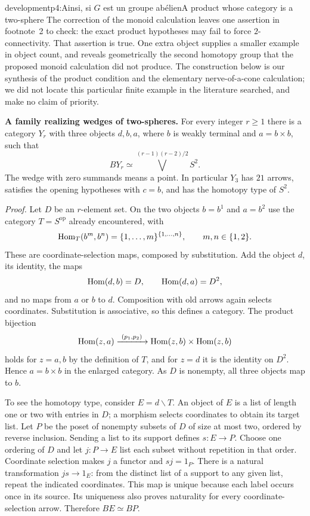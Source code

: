\begin{dcomment}{development}{p4:Ainsi, si $G$ est un groupe abélien}{A product whose category is a two-sphere}
The correction of the monoid calculation leaves one assertion in footnote~2 to check: the exact product hypotheses may fail to force $2$-connectivity. That assertion is true. One extra object supplies a smaller example in object count, and reveals geometrically the second homotopy group that the proposed monoid calculation did not produce. The construction below is our synthesis of the product condition and the elementary nerve-of-a-cone calculation; we did not locate this particular finite example in the literature searched, and make no claim of priority.

\textbf{A family realizing wedges of two-spheres.}\ours
For every integer $r\ge1$ there is a category $Y_r$ with three objects $d,b,a$, where $b$ is weakly terminal and $a=b\times b$, such that
\[
 BY_r\simeq\bigvee^{(r-1)(r-2)/2}S^2.
\]
The wedge with zero summands means a point. In particular $Y_3$ has $21$ arrows, satisfies the opening hypotheses with $c=b$, and has the homotopy type of $S^2$.

\emph{Proof.} Let $D$ be an $r$-element set. On the two objects $b=b^1$ and $a=b^2$ use the category $T=S^{\mathrm{op}}$ already encountered, with
\[
 \mathrm{Hom}_T(b^m,b^n)=\{1,\ldots,m\}^{\{1,\ldots,n\}},
 \qquad m,n\in\{1,2\}.
\]
These are coordinate-selection maps, composed by substitution. Add the object $d$, its identity, the maps
\[
 \mathrm{Hom}(d,b)=D,\qquad \mathrm{Hom}(d,a)=D^2,
\]
and no maps from $a$ or $b$ to $d$. Composition with old arrows again selects coordinates. Substitution is associative, so this defines a category. The product bijection
\[
 \mathrm{Hom}(z,a)\xrightarrow{\ (p_1,p_2)\ }
 \mathrm{Hom}(z,b)\times\mathrm{Hom}(z,b)
\]
holds for $z=a,b$ by the definition of $T$, and for $z=d$ it is the identity on $D^2$. Hence $a=b\times b$ in the enlarged category. As $D$ is nonempty, all three objects map to $b$.

To see the homotopy type, consider $E=d\backslash T$. An object of $E$ is a list of length one or two with entries in $D$; a morphism selects coordinates to obtain its target list. Let $P$ be the poset of nonempty subsets of $D$ of size at most two, ordered by reverse inclusion. Sending a list to its support defines $s:E\to P$. Choose one ordering of $D$ and let $j:P\to E$ list each subset without repetition in that order. Coordinate selection makes $j$ a functor and $sj=1_P$. There is a natural transformation $js\to1_E$: from the distinct list of a support to any given list, repeat the indicated coordinates. This map is unique because each label occurs once in its source. Its uniqueness also proves naturality for every coordinate-selection arrow. Therefore $BE\simeq BP$.


\end{dcomment}
